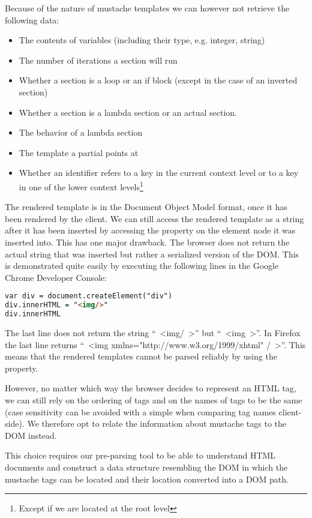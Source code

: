 \documentclass[thesis.tex]{subfiles}
\begin{document}
Because of the nature of mustache templates we can however not retrieve the
following data:

\begin{itemize}
\item The contents of variables (including their type, e.g. integer, string)
\item The number of iterations a section will run
\item Whether a section is a loop or an if block
	(except in the case of an inverted section)
\item Whether a section is a lambda section or an actual section.
\item The behavior of a lambda section
\item The template a partial points at
\item Whether an identifier refers to a key in the current context level or
	to a key in one of the lower context levels\footnote{Except if we are
	located at the root level}
\end{itemize}

The rendered template is in the Document Object Model format, once it has
been rendered by the client. We can still access the rendered template as a
string after it has been inserted by accessing the  property
on the element node it was inserted into. This has one major drawback.
The browser does not return the actual string that was inserted but rather a
serialized version of the DOM. This is demonstrated quite easily by executing
the following lines in the Google Chrome Developer Console:
\begin{lstlisting}[language=HTML]
var div = document.createElement("div")
div.innerHTML = "<img/>"
div.innerHTML
\end{lstlisting}

The last line does not return the string ``\ <img/\ >'' but ``\ <img\ >''.
In Firefox the last line returns ``\ <img xmlns="http://www.w3.org/1999/xhtml" /\ >''.
This means that the rendered templates cannot be parsed reliably by using the
 property.

However, no matter which way the browser decides to represent an HTML tag,
we can still rely on the ordering of tags and on the names of tags to be the same
(case sensitivity can be avoided with a simple
 when comparing tag names client-side).
We therefore opt to relate the information about mustache tags to the DOM instead.

This choice requires our pre-parsing tool to be able to understand
HTML documents and construct a data structure resembling the DOM in which the
mustache tags can be located and their location converted into a DOM path.
\end{document}
